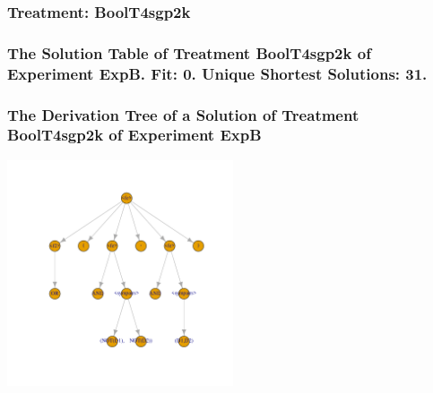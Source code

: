 \documentclass[18pt,c]{beamer}
\begin{document}
 \begin{frame}
 \fontsize{8pt}{9pt}\selectfont
 \frametitle{ Treatment: BoolT4sgp2k }

 \label{ExpBStatsTable027.tex}  
 \end{frame}

 \begin{frame}
 \fontsize{8pt}{9pt}\selectfont
 \frametitle{ The Solution Table of Treatment BoolT4sgp2k of Experiment ExpB. Fit: 0. Unique Shortest Solutions: 31. }

 \label{ExpBSolutionTable020.tex}  
 \end{frame}

 \begin{frame}
 \frametitle{ The Derivation Tree of a Solution of Treatment BoolT4sgp2k of Experiment ExpB }
 \begin{center}
\includegraphics[width=0.5\textwidth, angle=0]
{ExpBDerivationTreeFigure020.pdf}
 \end{center}
 \label{report/ExpBDerivationTreeFigure020.pdf}  
 \end{frame}
\end{document}

